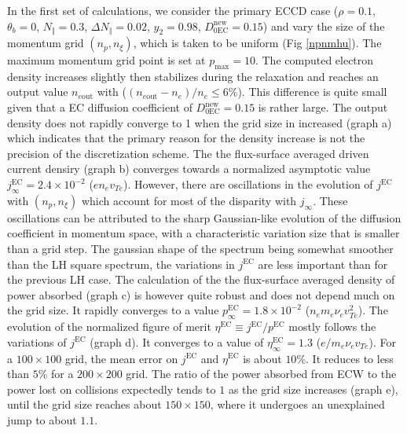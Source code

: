 In the first set of calculations, we consider the primary ECCD case
($\rho=0.1$, $\theta_{b}=0$, $N_{\Vert}=0.3$, $\Delta N_{\Vert}=0.02$,
$y_{2}=0.98$, $D_{0\text{EC}}^{\text{new}}=0.15$) and vary the size of the
momentum grid $\left(  n_{p},n_{\xi}\right)  $, which is taken to be uniform
(Fig \ref{npnmhu}). The maximum momentum grid point is set at $p_{\max}=10$.
The computed electron density increases slightly then stabilizes during the
relaxation and reaches an output value $n_{e\text{out}}$ with ($\left(
n_{e\text{out}}-n_{e}\right)  /n_{e}\leq6$\%). This difference is quite small
given that a EC diffusion coefficient of $D_{0\text{EC}}^{\text{new}}=0.15$ is
rather large. The output density does not rapidly converge to 1 when the grid
size in increased (graph a) which indicates that the primary reason for the
density increase is not the precision of the discretization scheme. The the
flux-surface averaged driven current densiry (graph b) converges towards a
normalized asymptotic value $j_{\infty}^{\text{EC}}=2.4\times10^{-2}$
($en_{e}v_{Te}$). However, there are oscillations in the evolution of
$j^{\text{EC}}$ with $\left(  n_{p},n_{\xi}\right)  $ which account for most
of the disparity with $j_{\infty}$. These oscillations can be attributed to
the sharp Gaussian-like evolution of the diffusion coefficient in momentum
space, with a characteristic variation size that is smaller than a grid step.
The gaussian shape of the spectrum being somewhat smoother than the LH square
spectrum, the variations in $j^{\text{EC}}$ are less important than for the
previous LH case. The calculation of the the flux-surface averaged density of
power absorbed (graph c) is however quite robust and does not depend much on
the grid size. It rapidly converges to a value $p_{\infty}^{\text{EC}%
}=1.8\times10^{-2}$ ($n_{e}m_{e}\nu_{e}v_{Te}^{2}$). The evolution of the
normalized figure of merit $\eta^{\text{EC}}\equiv j^{\text{EC}}/p^{\text{EC}%
}$ mostly follows the variations of $j^{\text{EC}}$ (graph d). It converges to
a value of $\eta_{\infty}^{\text{EC}}=1.3$ ($e/m_{e}\nu_{e}v_{Te}$). For a
$100\times100$ grid, the mean error on $j^{\text{EC}}$ and $\eta^{\text{EC}}$
is about $10$\%. It reduces to less than $5$\% for a $200\times200$ grid. The
ratio of the power absorbed from ECW to the power lost on collisions
expectedly tends to $1$ as the grid size increases (graph e), until the grid
size reaches about $150\times150$, where it undergoes an unexplained jump to
about $1.1$.


